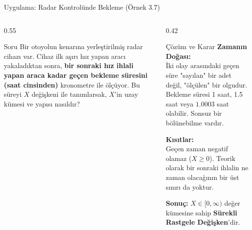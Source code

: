 ﻿\documentclass[light]{lutbeamer}
\begin{document}
\begin{frame}{Uygulama: Radar Kontrolünde Bekleme (Örnek 3.7)}
\small
\begin{columns}[T]
  \begin{column}{0.55\textwidth}
    \begin{block}{Soru}
      Bir otoyolun kenarına yerleştirilmiş radar cihazı var. 
      Cihaz ilk aşırı hız yapan aracı yakaladıktan sonra, \textbf{bir sonraki hız ihlali yapan araca kadar geçen bekleme süresini (saat cinsinden)} kronometre ile ölçüyor.
      Bu süreyi $X$ değişkeni ile tanımlarsak, $X$'in uzay kümesi ve yapısı nasıldır?
    \end{block}
  \end{column}
  
  \begin{column}{0.42\textwidth}
    \begin{alertblock}{Çözüm ve Karar}
      \textbf{Zamanın Doğası:} \\
      İki olay arasındaki geçen süre "sayılan" bir adet değil, "ölçülen" bir olgudur. 
      Bekleme süresi 1 saat, 1.5 saat veya $1.0003$ saat olabilir. Sonsuz bir bölünebilme vardır.
      
      \vspace{0.15cm}
      \textbf{Kısıtlar:} \\
      Geçen zaman negatif olamaz ($X \ge 0$). Teorik olarak bir sonraki ihlalin ne zaman olacağının bir üst sınırı da yoktur.
      
      \vspace{0.15cm}
      \textbf{Sonuç:} $X \in [0, \infty)$ değer kümesine sahip \textbf{Sürekli Rastgele Değişken}'dir.
    \end{alertblock}
  \end{column}
\end{columns}
\end{frame}
\end{document}
